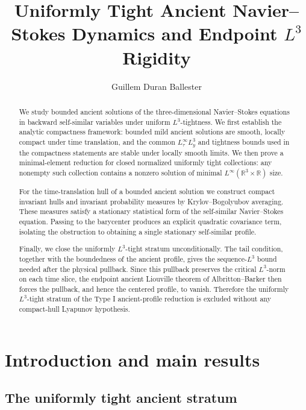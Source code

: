 \documentclass[11pt]{amsart}
\title[Uniformly tight ancient dynamics]
{Uniformly Tight Ancient Navier--Stokes Dynamics and Endpoint \(L^3\) Rigidity}
\author{Guillem Duran Ballester}
\date{}
\theoremstyle{plain}
\theoremstyle{definition}
\theoremstyle{remark}
\numberwithin{equation}{section}
\newcommand{\R}{\mathbb R}
\begin{document}
\begin{abstract}
We study bounded ancient solutions of the three-dimensional Navier--Stokes
equations in backward self-similar variables under uniform \(L^3\)-tightness.
We first establish the analytic compactness framework: bounded mild ancient
solutions are smooth, locally compact under time translation, and the
common \(L^\infty_\tau L^3_y\) and tightness bounds used in the compactness
statements are stable under locally smooth limits.  We then prove a
minimal-element reduction for closed normalized uniformly tight collections:
any nonempty such collection contains a nonzero solution of minimal
\(L^\infty(\R^3\times\R)\) size.

For the time-translation hull of a bounded ancient solution we construct compact
invariant hulls and invariant probability measures by Krylov--Bogolyubov
averaging.  These measures satisfy a stationary statistical form of the
self-similar Navier--Stokes equation.  Passing to the barycenter produces an
explicit quadratic covariance term, isolating the obstruction to obtaining a
single stationary self-similar profile.

Finally, we close the uniformly \(L^3\)-tight stratum unconditionally.  The
tail condition, together with the boundedness of the ancient profile, gives the
sequence-\(L^3\) bound needed after the physical pullback.  Since this pullback
preserves the critical \(L^3\)-norm on each time slice, the endpoint ancient
Liouville theorem of
Albritton--Barker then forces the pullback, and hence the centered profile, to
vanish.  Therefore the uniformly \(L^3\)-tight stratum of the Type I
ancient-profile reduction is excluded without any compact-hull Lyapunov
hypothesis.
\end{abstract}

\maketitle

\section{Introduction and main results}\label{sec:introduction}

\subsection{The uniformly tight ancient stratum}
\end{document}

